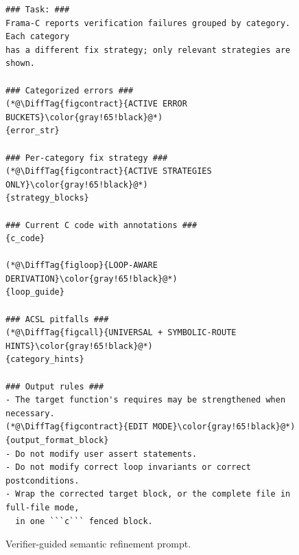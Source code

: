 \begin{figure}[H]
\centering
\begin{tcolorbox}[promptboxcompact, title={Verifier-guided refinement prompt}, width=\columnwidth]
\begin{lstlisting}[style=PromptInnerCompact]
### Task: ###
Frama-C reports verification failures grouped by category. Each category
has a different fix strategy; only relevant strategies are shown.

### Categorized errors ###
(*@\DiffTag{figcontract}{ACTIVE ERROR BUCKETS}\color{gray!65!black}@*)
{error_str}

### Per-category fix strategy ###
(*@\DiffTag{figcontract}{ACTIVE STRATEGIES ONLY}\color{gray!65!black}@*)
{strategy_blocks}

### Current C code with annotations ###
{c_code}

(*@\DiffTag{figloop}{LOOP-AWARE DERIVATION}\color{gray!65!black}@*)
{loop_guide}

### ACSL pitfalls ###
(*@\DiffTag{figcall}{UNIVERSAL + SYMBOLIC-ROUTE HINTS}\color{gray!65!black}@*)
{category_hints}

### Output rules ###
- The target function's requires may be strengthened when necessary.
(*@\DiffTag{figcontract}{EDIT MODE}\color{gray!65!black}@*)
{output_format_block}
- Do not modify user assert statements.
- Do not modify correct loop invariants or correct postconditions.
- Wrap the corrected target block, or the complete file in full-file mode,
  in one ```c``` fenced block.
\end{lstlisting}
\end{tcolorbox}
\caption{Verifier-guided semantic refinement prompt.}
\label{fig:prompt-refine}
\end{figure}
